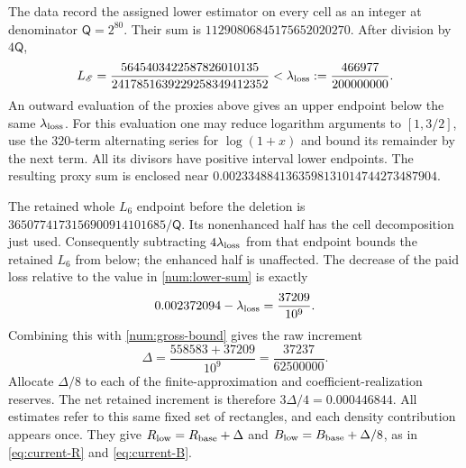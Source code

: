 The data record the assigned lower estimator on every cell as
an integer at denominator $\mathsf Q=2^{80}$.  Their sum is
$11290806845175652020270$.  After division by $4\mathsf Q$,
\begin{equation}
 L_{\mathscr E}
 =\frac{5645403422587826010135}
 {2417851639229258349412352}
 <\lambda_{\rm loss}:=\frac{466977}{200000000}.
 \label{num:saved-loss}
\end{equation}
An outward evaluation of the proxies above gives an
upper endpoint below the same $\lambda_{\rm loss}$.  For this
evaluation one may reduce logarithm arguments to
$[1,3/2]$, use the $320$-term alternating series for
$\log(1+x)$ and bound its remainder by the next term.
All its divisors have positive interval lower endpoints.
The resulting proxy sum is enclosed near
$0.0023348841363598131014744273487904$.

The retained whole $L_6$ endpoint before the deletion is
$3650774173156900914101685/\mathsf Q$.  Its nonenhanced half
has the cell decomposition just used.  Consequently
subtracting $4\lambda_{\rm loss}$ from that endpoint bounds the
retained $L_6$ from below; the enhanced half is unaffected.
The decrease of the paid loss relative to the value
in \eqref{num:lower-sum} is exactly
\[
 0.002372094-\lambda_{\rm loss}=\frac{37209}{10^9}.
\]
Combining this with \eqref{num:gross-bound} gives the
raw increment
\[
 \Delta=\frac{558583+37209}{10^9}
       =\frac{37237}{62500000}.
\]
Allocate $\Delta/8$ to each of the finite-approximation
and coefficient-realization reserves.  The net retained
increment is therefore $3\Delta/4=0.000446844$.
All estimates refer to this same fixed set of rectangles,
and each density contribution appears once.  They give
$R_{\rm low}=R_{\rm base}+\Delta$ and
$B_{\rm low}=B_{\rm base}+\Delta/8$, as in
\eqref{eq:current-R} and \eqref{eq:current-B}.
